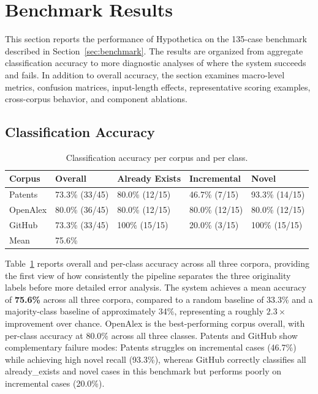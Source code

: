 \section{Benchmark Results}
\label{sec:results}

This section reports the performance of Hypothetica on the 135-case benchmark described in Section~\ref{sec:benchmark}. The results are organized from aggregate classification accuracy to more diagnostic analyses of where the system succeeds and fails. In addition to overall accuracy, the section examines macro-level metrics, confusion matrices, input-length effects, representative scoring examples, cross-corpus behavior, and component ablations.
 
\subsection{Classification Accuracy}
 
\begin{table}[width=\textwidth,cols=5,pos=ht]
    \caption{Classification accuracy per corpus and per class.}
    \label{tab:accuracy}
    \begin{tabular*}{\textwidth}{@{\extracolsep{\fill}}lllll@{}}
        \toprule
        Corpus   & Overall        & Already Exists & Incremental    & Novel          \\
        \midrule
        Patents  & 73.3\% (33/45) & 80.0\% (12/15) & 46.7\% (7/15)  & 93.3\% (14/15) \\
        OpenAlex & 80.0\% (36/45) & 80.0\% (12/15) & 80.0\% (12/15) & 80.0\% (12/15) \\
        GitHub   & 73.3\% (33/45) & 100\% (15/15)  & 20.0\% (3/15)  & 100\% (15/15)  \\
        \midrule
        Mean     & 75.6\%         &                &                &                \\
        \bottomrule
    \end{tabular*}
\end{table}
 
Table~\ref{tab:accuracy} reports overall and per-class accuracy across all three corpora, providing the first view of how consistently the pipeline separates the three originality labels before more detailed error analysis. The system achieves a mean accuracy of \textbf{75.6\%} across all three corpora, compared to a random baseline of 33.3\% and a majority-class baseline of approximately 34\%, representing a roughly $2.3\times$ improvement over chance. OpenAlex is the best-performing corpus overall, with per-class accuracy at 80.0\% across all three classes. Patents and GitHub show complementary failure modes: Patents struggles on incremental cases (46.7\%) while achieving high novel recall (93.3\%), whereas GitHub correctly classifies all already\_exists and novel cases in this benchmark but performs poorly on incremental cases (20.0\%).

